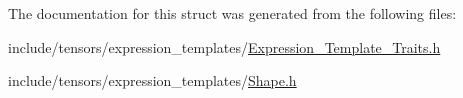 The documentation for this struct was generated from the following files\+:\begin{DoxyCompactItemize}
\item 
include/tensors/expression\+\_\+templates/\hyperlink{Expression__Template__Traits_8h}{Expression\+\_\+\+Template\+\_\+\+Traits.\+h}\item 
include/tensors/expression\+\_\+templates/\hyperlink{Shape_8h}{Shape.\+h}\end{DoxyCompactItemize}
